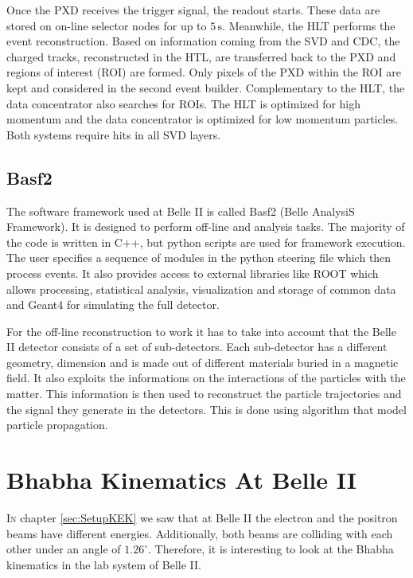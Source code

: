 \documentclass[a4paper,11pt,twosided,final,german,openbib,pdftex,listof=totoc,bibliography=totoc]{scrbook}
\begin{document}
Once the PXD receives the trigger signal, the readout starts. These data are stored on on-line selector nodes for up to $5\,\textrm{s}$. Meanwhile, the HLT performs the event reconstruction. Based on information coming from the SVD and CDC, the charged tracks, reconstructed in the HTL, are transferred back to the PXD and regions of interest (ROI) are formed. Only pixels of the PXD within the ROI are kept and considered in the second event builder. Complementary to the HLT, the data concentrator also searches for ROIs. The HLT is optimized for high momentum and the data concentrator is optimized for low momentum particles. Both systems require hits in all SVD layers. \cite{B2TR}


\section{Basf2}
\label{sec:Tools}

The software framework used at Belle II is called Basf2 (Belle AnalysiS Framework). It is designed to perform off-line and analysis tasks. The majority of the code is written in C++, but python scripts are used for framework execution. The user specifies a sequence of modules in the python steering file which then process events. It also provides access to external libraries like ROOT which allows processing, statistical analysis, visualization and storage of common data and Geant4 for simulating the full detector.\cite{Moll_2011}


For the off-line reconstruction to work it has to take into account that the Belle II detector consists of a set of sub-detectors. Each sub-detector has a different geometry, dimension and is made out of different materials buried in a magnetic field. It also exploits the informations on the interactions of the particles with the matter. This information is then used to reconstruct the particle trajectories and the signal they generate in the detectors. This is done using algorithm that model particle propagation.






\chapter{Bhabha Kinematics At Belle II}
\label{cha:Kinematics}

\lettrine{I}{n} chapter \ref{sec:SetupKEK} we saw that at Belle II the electron and the positron beams have different energies. Additionally, both beams are colliding with each other under an angle of $1.26^{\circ}$. Therefore, it is interesting to look at the Bhabha kinematics in the lab system of Belle II.
\end{document}
